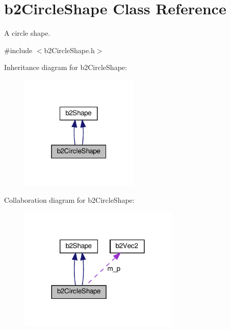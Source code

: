\hypertarget{classb2CircleShape}{}\section{b2\+Circle\+Shape Class Reference}
\label{classb2CircleShape}


A circle shape.  




{\ttfamily \#include $<$b2\+Circle\+Shape.\+h$>$}



Inheritance diagram for b2\+Circle\+Shape\+:
\nopagebreak
\begin{figure}[H]
\begin{center}
\leavevmode
\includegraphics[width=160pt]{classb2CircleShape__inherit__graph}
\end{center}
\end{figure}


Collaboration diagram for b2\+Circle\+Shape\+:
\nopagebreak
\begin{figure}[H]
\begin{center}
\leavevmode
\includegraphics[width=216pt]{classb2CircleShape__coll__graph}
\end{center}
\end{figure}
